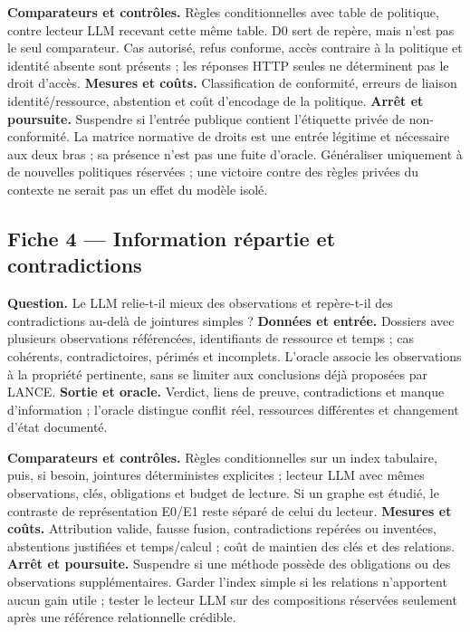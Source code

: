 \documentclass[11pt,a4paper]{article}
\begin{document}
\textbf{Comparateurs et contrôles.} Règles conditionnelles avec table de politique,
contre lecteur LLM recevant cette même table. D0 sert de repère, mais n'est
pas le seul comparateur. Cas autorisé, refus conforme, accès contraire à la
politique et identité absente sont présents ; les réponses HTTP seules ne
déterminent pas le droit d'accès.
\textbf{Mesures et coûts.} Classification de conformité, erreurs de liaison
identité/ressource, abstention et coût d'encodage de la politique.
\textbf{Arrêt et poursuite.} Suspendre si l'entrée publique contient l'étiquette
privée de non-conformité. La matrice normative de droits est une entrée légitime
et nécessaire aux deux bras ; sa présence n'est pas une fuite d'oracle.
Généraliser uniquement à de nouvelles politiques réservées ; une victoire
contre des règles privées du contexte ne serait pas un effet du modèle isolé.

\subsection{Fiche 4 --- Information répartie et contradictions}
\textbf{Question.} Le LLM relie-t-il mieux des observations et repère-t-il des
contradictions au-delà de jointures simples ?
\textbf{Données et entrée.} Dossiers avec plusieurs observations référencées,
identifiants de ressource et temps ; cas cohérents, contradictoires, périmés
et incomplets. L'oracle associe les observations à la propriété pertinente,
sans se limiter aux conclusions déjà proposées par LANCE.
\textbf{Sortie et oracle.} Verdict, liens de preuve, contradictions et manque
d'information ; l'oracle distingue conflit réel, ressources différentes et
changement d'état documenté.

\textbf{Comparateurs et contrôles.} Règles conditionnelles sur un index tabulaire,
puis, si besoin, jointures déterministes explicites ; lecteur LLM avec mêmes
observations, clés, obligations et budget de lecture. Si un graphe est étudié,
le contraste de représentation E0/E1 reste séparé de celui du lecteur.
\textbf{Mesures et coûts.} Attribution valide, fausse fusion, contradictions
repérées ou inventées, abstentions justifiées et temps/calcul ; coût de maintien
des clés et des relations.
\textbf{Arrêt et poursuite.} Suspendre si une méthode possède des obligations
ou des observations supplémentaires. Garder l'index simple si les relations
n'apportent aucun gain utile ; tester le lecteur LLM sur des compositions
réservées seulement après une référence relationnelle crédible.
\end{document}
